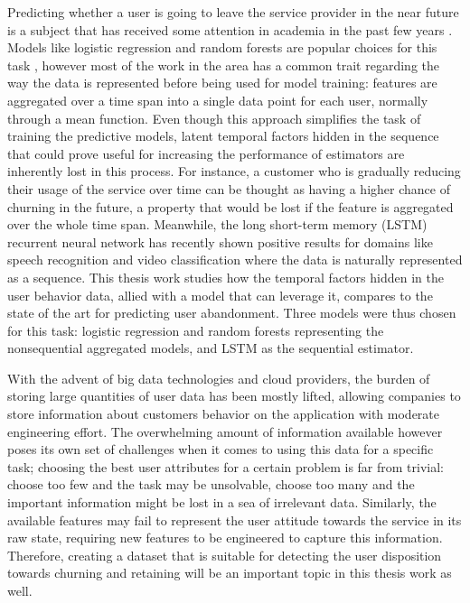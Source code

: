 \documentclass{kththesis}
\begin{document}
	Predicting whether a user is going to leave the service provider in the near future is a subject that has received some attention in academia in the past few years \citep{Pudipeddi2014}\citep{GurAli2014}\citep{Drachen2016RapidPO}. Models like logistic regression and random forests are popular choices for this task \citep{mahajan2015review}, however most of the work in the area has a common trait regarding the way the data is represented before being used for model training: features are aggregated over a time span into a single data point for each user, normally through a mean function. Even though this approach simplifies the task of training the predictive models, latent temporal factors hidden in the sequence that could prove useful for increasing the performance of estimators are inherently lost in this process. For instance, a customer who is gradually reducing their usage of the service over time can be thought as having a higher chance of churning in the future, a property that would be lost if the feature is aggregated over the whole time span. Meanwhile, the long short-term memory (LSTM) recurrent neural network has recently shown positive results for domains like speech recognition \citep{graves2013speech} and video classification \citep{yue2015beyond} where the data is naturally represented as a sequence. This thesis work studies how the temporal factors hidden in the user behavior data, allied with a model that can leverage it, compares to the state of the art for predicting user abandonment. Three models were thus chosen for this task: logistic regression and random forests representing the nonsequential aggregated models, and LSTM as the sequential estimator.	
	
	With the advent of big data technologies and cloud providers, the burden of storing large quantities of user data has been mostly lifted, allowing companies to store information about customers behavior on the application with moderate engineering effort. The overwhelming amount of information available however poses its own set of challenges when it comes to using this data for a specific task; choosing the best user attributes for a certain problem is far from trivial: choose too few and the task may be unsolvable, choose too many and the important information might be lost in a sea of irrelevant data. Similarly, the available features may fail to represent the user attitude towards the service in its raw state, requiring  new features to be engineered to capture this information. Therefore, creating a dataset that is suitable for detecting the user disposition towards churning and retaining will be an important topic in this thesis work as well.
	
\end{document}
